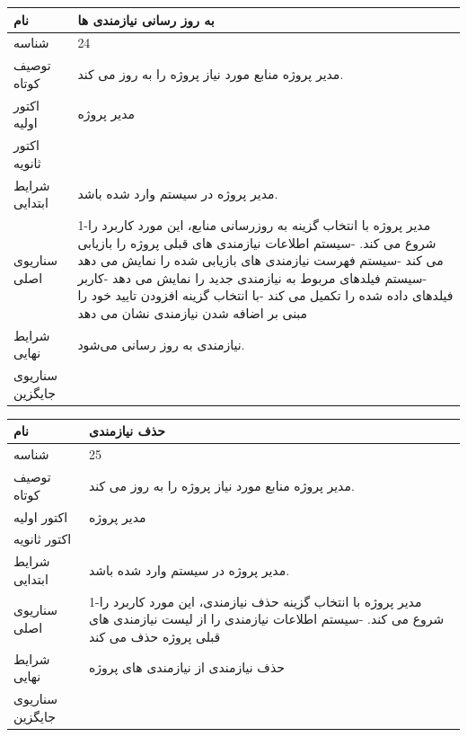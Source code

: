 \documentclass{article}
\begin{document}
\vspace{2cm}

\begin{tabular}{|p{2cm}|p{10cm}|}
\hline
نام
&
به روز رسانی نیازمندی ها
\\
\hline
شناسه
&
24
\\
\hline
توصیف کوتاه
&
مدیر پروژه منابع مورد نیاز پروژه را به روز می کند. 
\\
\hline
اکتور اولیه
&
مدیر پروژه
\\
\hline
اکتور ثانویه
&

\\
\hline
شرایط ابتدایی
&
مدیر پروژه در سیستم وارد شده باشد.
\\
\hline
سناریوی اصلی
&
1-مدیر پروژه با انتخاب گزینه به روزرسانی منابع، این مورد کاربرد را شروع می کند.
\newline
2-سیستم اطلاعات نیازمندی های قبلی پروژه را بازیابی می کند
\newline
3-سیستم فهرست نیازمندی های بازیابی شده را نمایش می دهد
\newline
4-سیستم فیلدهای مربوط به نیازمندی جدید را نمایش می دهد
\newline
5-کاربر فیلدهای داده شده را تکمیل می کند
\newline
6-با انتخاب گزینه افزودن تایید خود را مبنی بر اضافه شدن نیازمندی نشان می دهد
\\
\hline
شرایط نهایی
&
نیازمندی به روز رسانی می‌شود.
\\
\hline
سناریوی جایگزین
&

\\
\hline
\end{tabular}

\vspace{2cm}

\begin{tabular}{|p{2cm}|p{10cm}|}
\hline
نام
&
حذف نیازمندی
\\
\hline
شناسه
&
25
\\
\hline
توصیف کوتاه
&
مدیر پروژه منابع مورد نیاز پروژه را به روز می کند. 
\\
\hline
اکتور اولیه
&
مدیر پروژه
\\
\hline
اکتور ثانویه
&

\\
\hline
شرایط ابتدایی
&
مدیر پروژه در سیستم وارد شده باشد.
\\
\hline
سناریوی اصلی
&
1-مدیر پروژه با انتخاب گزینه حذف نیازمندی، این مورد کاربرد را شروع می کند.
\newline
2-سیستم اطلاعات نیازمندی را از لیست نیازمندی های قبلی پروژه حذف می کند
\\
\hline
شرایط نهایی
&
حذف نیازمندی از نیازمندی های پروژه
\\
\hline
سناریوی جایگزین
&

\\
\hline
\end{tabular}
\end{document}
